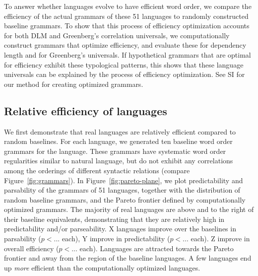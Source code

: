 \documentclass[9pt,twocolumn,twoside,lineno]{pnas-new}
\begin{document}
To answer whether languages evolve to have efficient word order, we compare the efficiency of the actual grammars of these 51 languages to randomly constructed baseline grammars.
To show that this process of efficiency optimization accounts for both DLM and Greenberg's correlation universals, we computationally construct grammars that optimize efficiency, and evaluate these for dependency length and for Greenberg's universals.
If hypothetical grammars that are optimal for efficiency exhibit these typological patterns, this shows that these language universals can be explained by the process of efficiency optimization.
See SI for our method for creating optimized grammars.




\subsection{Relative efficiency of languages}
\label{sec:relative-efficiency}

We first demonstrate that real languages are relatively efficient compared to random baselines. For each language, we generated ten baseline word order grammars for the language.
These grammars have systematic word order regularities similar to natural language, but do not exhibit any correlations among the orderings of different syntactic relations (compare Figure~\ref{fig:grammars}).
In Figure~\ref{fig:pareto-plane}, we plot predictability and parsability of the grammars of 51 languages, together with the distribution of random baseline grammars, and the Pareto frontier defined by computationally optimized grammars.
The majority of real languages are above and to the right of their baseline equivalents, demonstrating that they are relatively high in predictability and/or parseability.
X languages improve over the baselines in parsability ($p < ...$ each), Y improve in predictability ($p < ...$ each).
Z improve in overall efficiency ($p < ...$ each).
Languages are attracted towards the Pareto frontier and away from the region of the baseline languages.
A few languages end up \emph{more} efficient than the computationally optimized languages.

\end{document}
